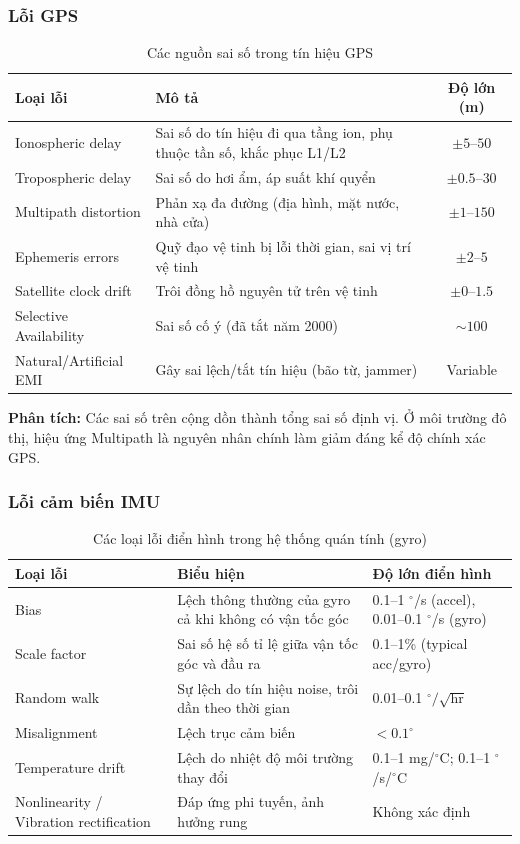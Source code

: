 \subsubsection{Lỗi GPS} 
\begin{table}[h!]
\centering
\begin{tabular}{|l|p{7cm}|c|}
\hline
\textbf{Loại lỗi} & \textbf{Mô tả} & \textbf{Độ lớn (m)} \\
\hline
Ionospheric delay & Sai số do tín hiệu đi qua tầng ion, phụ thuộc tần số, khắc phục L1/L2 & $\pm 5$--$50$ \\
\hline
Tropospheric delay & Sai số do hơi ẩm, áp suất khí quyển & $\pm 0.5$--$30$ \\
\hline
Multipath distortion & Phản xạ đa đường (địa hình, mặt nước, nhà cửa) & $\pm 1$--$150$ \\
\hline
Ephemeris errors & Quỹ đạo vệ tinh bị lỗi thời gian, sai vị trí vệ tinh & $\pm 2$--$5$ \\
\hline
Satellite clock drift & Trôi đồng hồ nguyên tử trên vệ tinh & $\pm 0$--$1.5$ \\
\hline
Selective Availability & Sai số cố ý (đã tắt năm 2000) & $\sim 100$ \\
\hline
Natural/Artificial EMI & Gây sai lệch/tắt tín hiệu (bão từ, jammer) & Variable \\
\hline
\end{tabular}
\caption{Các nguồn sai số trong tín hiệu GPS}
\end{table}


\noindent\textbf{Phân tích:} Các sai số trên cộng dồn thành tổng sai số định vị. Ở môi trường đô thị, hiệu ứng Multipath là nguyên nhân chính làm giảm đáng kể độ chính xác GPS.

\newpage
\subsubsection{Lỗi cảm biến IMU}
    \begin{table}[h!]
\centering
\begin{tabular}{|l|p{6cm}|p{5cm}|}
\hline
\textbf{Loại lỗi} & \textbf{Biểu hiện} & \textbf{Độ lớn điển hình} \\
\hline
Bias & Lệch thông thường của gyro cả khi không có vận tốc góc & 0.1--1 $^\circ$/s (accel), 0.01--0.1 $^\circ$/s (gyro) \\
\hline
Scale factor & Sai số hệ số tỉ lệ giữa vận tốc góc và đầu ra & 0.1--1\% (typical acc/gyro) \\
\hline
Random walk & Sự lệch do tín hiệu noise, trôi dần theo thời gian & 0.01--0.1 $^\circ/\sqrt{\text{hr}}$ \\
\hline
Misalignment & Lệch trục cảm biến & $<0.1^\circ$ \\
\hline
Temperature drift & Lệch do nhiệt độ môi trường thay đổi & 0.1--1 mg/$^\circ$C; 0.1--1 $^\circ$/s/$^\circ$C \\
\hline
Nonlinearity / Vibration rectification & Đáp ứng phi tuyến, ảnh hưởng rung & Không xác định \\
\hline
\end{tabular}
\caption{Các loại lỗi điển hình trong hệ thống quán tính (gyro)}
\end{table}

